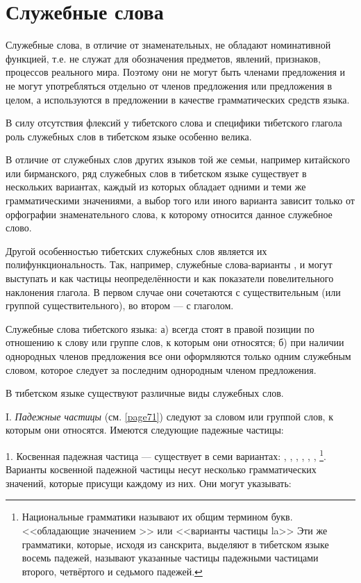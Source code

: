 \section{Служебные слова}
\label{sec:ss}

Служебные слова, в отличие от знаменательных, не обладают номинативной функцией, т.е. не служат для обозначения предметов, явлений, признаков, процессов реального мира. Поэтому они не могут быть членами предложения и не могут употребляться отдельно от членов предложения или предложения в целом, а используются в предложении в качестве грамматических средств языка.

В силу отсутствия флексий у тибетского слова и специфики тибетского глагола роль служебных слов в тибетском языке особенно велика.

В отличие от служебных слов других языков той же семьи, например китайского или бирманского, ряд служебных слов в тибетском языке существует в нескольких вариантах, каждый из которых обладает одними и теми же грамматическими значениями, а выбор того или иного варианта зависит только от орфографии знаменательного слова, к которому относится данное служебное слово.

Другой особенностью тибетских служебных слов является их полифункциональность. Так, например, служебные слова-варианты ,  и  могут выступать и как частицы неопределённости и как показатели повелительного наклонения глагола. В первом случае они сочетаются с существительным (или группой существительного), во втором --- с глаголом.

Служебные слова тибетского языка: а) всегда стоят в правой позиции по отношению к слову или группе слов, к которым они относятся; б) при наличии однородных членов предложения все они оформляются только одним служебным словом, которое следует за последним однородным членом предложения.

В тибетском языке существуют различные виды служебных слов.

I. \emph{Падежные частицы} (см. \ref{page71}) следуют за словом или группой слов, к которым они относятся. Имеются следующие падежные частицы:

1. Косвенная падежная частица --- существует в семи вариантах: , , , , , , \footnote[40]{Национальные грамматики называют их общим термином  букв. <<обладающие значением >> или <<варианты частицы la>> Эти же грамматики, которые, исходя из санскрита, выделяют в тибетском языке восемь падежей, называют указанные частицы падежными частицами второго, четвёртого и седьмого падежей.}.	
Варианты косвенной падежной частицы несут несколько грамматических значений, которые присущи каждому из них. Они могут указывать:

